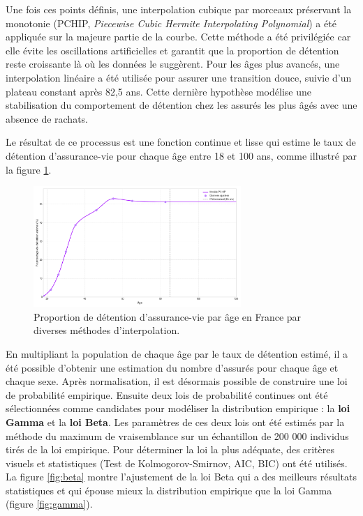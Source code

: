 Une fois ces points définis, une interpolation cubique par morceaux préservant la monotonie (PCHIP, \textit{Piecewise Cubic Hermite Interpolating Polynomial}) a été appliquée sur la majeure partie de la courbe. Cette méthode a été privilégiée car elle évite les oscillations artificielles et garantit que la proportion de détention reste croissante là où les données le suggèrent. Pour les âges plus avancés, une interpolation linéaire a été utilisée pour assurer une transition douce, suivie d'un plateau constant après 82,5 ans. Cette dernière hypothèse modélise une stabilisation du comportement de détention chez les assurés les plus âgés avec une absence de rachats.

Le résultat de ce processus est une fonction continue et lisse qui estime le taux de détention d'assurance-vie pour chaque âge entre 18 et 100 ans, comme illustré par la figure \ref{fig:interpolation_prop_age}.

\begin{figure}[H]
\centering
\includegraphics[width=0.7\textwidth]{images/2_chapitres/chapitre3/interpolation_prop_age.png}
\caption{Proportion de détention d'assurance-vie par âge en France par diverses méthodes d'interpolation.}
\label{fig:interpolation_prop_age}
\end{figure}


En multipliant la population de chaque âge par le taux de détention estimé, il a été possible d'obtenir une estimation du nombre d'assurés pour chaque âge et chaque sexe. Après normalisation, il est désormais possible de construire une loi de probabilité empirique. Ensuite deux lois de probabilité continues ont été sélectionnées comme candidates pour modéliser la distribution empirique : la \textbf{loi Gamma} et la \textbf{loi Beta}. Les paramètres de ces deux lois ont été estimés par la méthode du maximum de vraisemblance sur un échantillon de 200 000 individus tirés de la loi empirique. Pour déterminer la loi la plus adéquate, des critères visuels et statistiques (Test de Kolmogorov-Smirnov, AIC, BIC) ont été utilisés. La figure \ref{fig:beta} montre l'ajustement de la loi Beta qui a des meilleurs résultats statistiques et qui épouse mieux la distribution empirique que la loi Gamma (figure \ref{fig:gamma}). 

